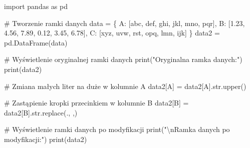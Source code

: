 \documentclass[
  polish,
  letterpaper,
  DIV=11,
  numbers=noendperiod]{scrreprt}
\newenvironment{Shaded}{\begin{snugshade}}{\end{snugshade}}
\newcommand{\BuiltInTok}[1]{\textcolor[rgb]{0.00,0.23,0.31}{#1}}
\newcommand{\CharTok}[1]{\textcolor[rgb]{0.13,0.47,0.30}{#1}}
\newcommand{\CommentTok}[1]{\textcolor[rgb]{0.37,0.37,0.37}{#1}}
\newcommand{\ImportTok}[1]{\textcolor[rgb]{0.00,0.46,0.62}{#1}}
\newcommand{\NormalTok}[1]{\textcolor[rgb]{0.00,0.23,0.31}{#1}}
\newcommand{\OperatorTok}[1]{\textcolor[rgb]{0.37,0.37,0.37}{#1}}
\newcommand{\StringTok}[1]{\textcolor[rgb]{0.13,0.47,0.30}{#1}}
\begin{document}
\begin{Shaded}
\begin{Highlighting}[]
\ImportTok{import}\NormalTok{ pandas }\ImportTok{as}\NormalTok{ pd}

\CommentTok{\# Tworzenie ramki danych}
\NormalTok{data }\OperatorTok{=}\NormalTok{ \{}
    \StringTok{\textquotesingle{}A\textquotesingle{}}\NormalTok{: [}\StringTok{\textquotesingle{}abc\textquotesingle{}}\NormalTok{, }\StringTok{\textquotesingle{}def\textquotesingle{}}\NormalTok{, }\StringTok{\textquotesingle{}ghi\textquotesingle{}}\NormalTok{, }\StringTok{\textquotesingle{}jkl\textquotesingle{}}\NormalTok{, }\StringTok{\textquotesingle{}mno\textquotesingle{}}\NormalTok{, }\StringTok{\textquotesingle{}pqr\textquotesingle{}}\NormalTok{],}
    \StringTok{\textquotesingle{}B\textquotesingle{}}\NormalTok{: [}\StringTok{\textquotesingle{}1.23\textquotesingle{}}\NormalTok{, }\StringTok{\textquotesingle{}4.56\textquotesingle{}}\NormalTok{, }\StringTok{\textquotesingle{}7.89\textquotesingle{}}\NormalTok{, }\StringTok{\textquotesingle{}0.12\textquotesingle{}}\NormalTok{, }\StringTok{\textquotesingle{}3.45\textquotesingle{}}\NormalTok{, }\StringTok{\textquotesingle{}6.78\textquotesingle{}}\NormalTok{],}
    \StringTok{\textquotesingle{}C\textquotesingle{}}\NormalTok{: [}\StringTok{\textquotesingle{}xyz\textquotesingle{}}\NormalTok{, }\StringTok{\textquotesingle{}uvw\textquotesingle{}}\NormalTok{, }\StringTok{\textquotesingle{}rst\textquotesingle{}}\NormalTok{, }\StringTok{\textquotesingle{}opq\textquotesingle{}}\NormalTok{, }\StringTok{\textquotesingle{}lmn\textquotesingle{}}\NormalTok{, }\StringTok{\textquotesingle{}ijk\textquotesingle{}}\NormalTok{]}
\NormalTok{\}}
\NormalTok{data2 }\OperatorTok{=}\NormalTok{ pd.DataFrame(data)}

\CommentTok{\# Wyświetlenie oryginalnej ramki danych}
\BuiltInTok{print}\NormalTok{(}\StringTok{"Oryginalna ramka danych:"}\NormalTok{)}
\BuiltInTok{print}\NormalTok{(data2)}

\CommentTok{\# Zmiana małych liter na duże w kolumnie \textquotesingle{}A\textquotesingle{}}
\NormalTok{data2[}\StringTok{\textquotesingle{}A\textquotesingle{}}\NormalTok{] }\OperatorTok{=}\NormalTok{ data2[}\StringTok{\textquotesingle{}A\textquotesingle{}}\NormalTok{].}\BuiltInTok{str}\NormalTok{.upper()}

\CommentTok{\# Zastąpienie kropki przecinkiem w kolumnie \textquotesingle{}B\textquotesingle{}}
\NormalTok{data2[}\StringTok{\textquotesingle{}B\textquotesingle{}}\NormalTok{] }\OperatorTok{=}\NormalTok{ data2[}\StringTok{\textquotesingle{}B\textquotesingle{}}\NormalTok{].}\BuiltInTok{str}\NormalTok{.replace(}\StringTok{\textquotesingle{}.\textquotesingle{}}\NormalTok{, }\StringTok{\textquotesingle{},\textquotesingle{}}\NormalTok{)}

\CommentTok{\# Wyświetlenie ramki danych po modyfikacji}
\BuiltInTok{print}\NormalTok{(}\StringTok{"}\CharTok{\textbackslash{}n}\StringTok{Ramka danych po modyfikacji:"}\NormalTok{)}
\BuiltInTok{print}\NormalTok{(data2)}
\end{Highlighting}
\end{Shaded}
\end{document}
